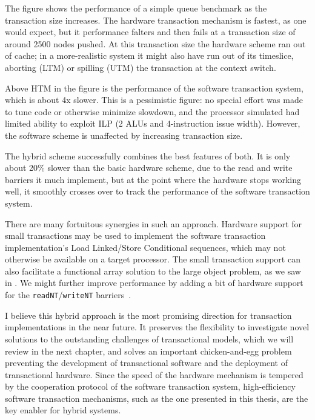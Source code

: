 The figure shows the performance of a simple queue benchmark as the
transaction size increases.  The hardware transaction mechanism is
fastest, as one would expect, but it performance falters and then
fails at a transaction size of around 2500 nodes pushed.  At this
transaction size the hardware scheme ran out of cache; in a
more-realistic system it might also have run out of its timeslice,
aborting (LTM) or spilling (UTM) the transaction at the context
switch.

Above HTM in the figure is the performance of the software transaction
system, which is about 4x slower.  This is a pessimistic figure: no
special effort was made to tune code or otherwise minimize slowdown,
and the processor simulated had limited ability to exploit ILP (2 ALUs
and 4-instruction issue width).  However, the software scheme is unaffected by
increasing transaction size.

The hybrid scheme successfully combines the best features of both.  It
is only about 20\% slower than the basic hardware scheme, due to the
read and write barriers it much implement, but at the point where the
hardware stops working well, it smoothly crosses over to track the
performance of the software transaction system.

There are many fortuitous synergies in such an approach.  
Hardware support for small transactions may
be used to implement the software transaction implementation's
Load Linked/Store Conditional sequences, which may not
otherwise be available on a target processor.
The small transaction support can also facilitate a functional array
solution to the large object problem, as we saw in
.  We might further improve performance by adding a
bit of hardware support for the \texttt{readNT}/\texttt{writeNT}
barriers~\cite{ClickTeWo05}.

I believe this hybrid approach is the most promising direction for
transaction implementations in the near future.  It preserves the
flexibility to investigate novel solutions to the outstanding challenges of
transactional models, which we will review in the next chapter, and
solves an important chicken-and-egg problem preventing the development
of transactional software and the deployment of transactional
hardware.  Since the speed of the hardware mechanism is tempered by
the cooperation protocol of the software transaction system,
high-efficiency software transaction mechanisms, such as the one
presented in this thesis, are the key enabler for hybrid systems.
